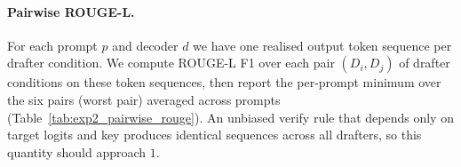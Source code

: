 \paragraph{Pairwise ROUGE-L.}
For each prompt $p$ and decoder $d$ we have one realised output token
sequence per drafter condition. We compute ROUGE-L F1 over each pair
$(D_i, D_j)$ of drafter conditions on these token sequences, then
report the per-prompt minimum over the six pairs (worst pair) averaged
across prompts (Table~\ref{tab:exp2_pairwise_rouge}). An unbiased
verify rule that depends only on target logits and key produces
identical sequences across all drafters, so this quantity should
approach $1$.

\begin{table}[h]
\centering
\caption{\textbf{Output quality.}
\textsc{lppl}$\downarrow$ under target.
ROUGE-L$\uparrow$ vs.\ gold \texttt{highlights}.
AATPS$\uparrow$ accepted target tokens per step.}
\label{tab:exp1_quality}
\small
\setlength{\tabcolsep}{4pt}
\end{table}

